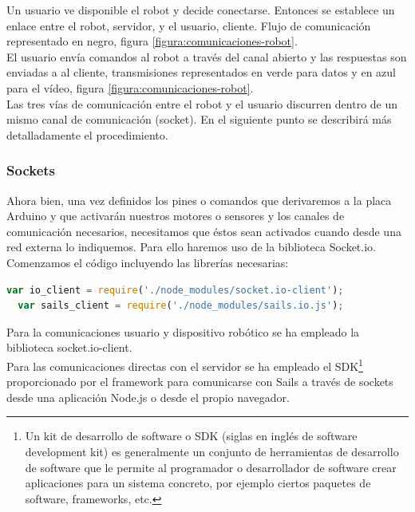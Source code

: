Un usuario ve disponible el robot y decide conectarse. Entonces se establece un enlace entre el robot, servidor, y el usuario, cliente. Flujo de comunicación representado en negro, figura \ref{figura:comunicaciones-robot}.\\

El usuario envía comandos al robot a través del canal abierto y las respuestas son enviadas a al cliente, transmisiones representados en verde para datos y en azul para el vídeo, figura \ref{figura:comunicaciones-robot}.\\

Las tres vías de comunicación entre el robot y el usuario discurren dentro de un mismo canal de comunicación (socket). En el siguiente punto se describirá más detalladamente el procedimiento.

\subsubsection{Sockets}

Ahora bien, una vez definidos los pines o comandos que derivaremos a la placa Arduino y que activarán nuestros motores o sensores y los canales de comunicación necesarios, necesitamos que éstos sean activados
cuando desde una red externa lo indiquemos. Para ello haremos uso de la biblioteca Socket.io. \\

Comenzamos el código incluyendo las librerías necesarias:\\

\begin{lstlisting}[language=JavaScript]
  var io_client = require('./node_modules/socket.io-client');
  var sails_client = require('./node_modules/sails.io.js');
\end{lstlisting}

Para la comunicaciones usuario y dispositivo robótico se ha empleado la biblioteca socket.io-client.\\

Para las comunicaciones directas con el servidor se ha empleado el SDK\footnote{Un kit de desarrollo de software o SDK (siglas en inglés de software development kit) es generalmente un conjunto de herramientas
de desarrollo de software que le permite al programador o desarrollador de software crear aplicaciones para un sistema concreto, por ejemplo ciertos paquetes de software, frameworks, etc.} proporcionado por el framework
para comunicarse con Sails a través de sockets desde una aplicación Node.js o desde el propio navegador.\\


